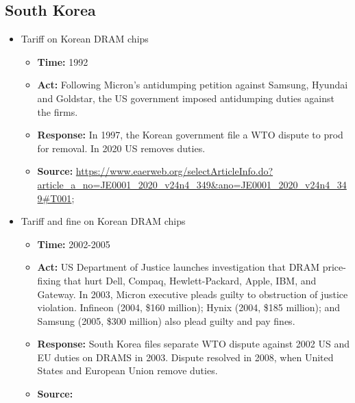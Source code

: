 	\subsection{South Korea}
		\begin{itemize}
		\item	Tariff on Korean DRAM chips
			\begin{itemize}
			\item \textbf{Time: } 1992
			\item \textbf{Act: } Following Micron's antidumping petition against Samsung, Hyundai and Goldstar, the US government imposed antidumping duties against the firms. 
			\item \textbf{Response: } In 1997, the Korean government file a WTO dispute to prod for removal. In 2020 US removes duties.
			\item	\textbf{Source: }\url{https://www.eaerweb.org/selectArticleInfo.do?article_a_no=JE0001_2020_v24n4_349\&ano=JE0001_2020_v24n4_349#T001}; \cite{Bown2020}
			\end{itemize}
			
		\item	Tariff and fine on Korean DRAM chips
			\begin{itemize}
			\item \textbf{Time: } 2002-2005
			\item \textbf{Act: } US Department of Justice launches investigation that DRAM price-fixing that hurt Dell, Compaq, Hewlett-Packard, Apple, IBM, and Gateway. In 2003, Micron executive pleads guilty to obstruction of justice violation. Infineon (2004, \$160 million); Hynix (2004, \$185 million); and Samsung (2005, \$300 million) also plead guilty and pay fines. 
			\item \textbf{Response: } South Korea files separate WTO dispute against 2002 US and EU duties on DRAMS in 2003. Dispute resolved in 2008, when United States and European Union remove duties.
			\item	\textbf{Source: } \cite{Bown2020}
			\end{itemize}
		\end{itemize}
		
